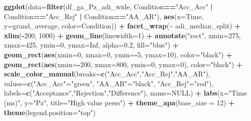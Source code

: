 \documentclass[
]{article}
\newenvironment{Shaded}{\begin{snugshade}}{\end{snugshade}}
\newcommand{\AttributeTok}[1]{\textcolor[rgb]{0.13,0.29,0.53}{#1}}
\newcommand{\ConstantTok}[1]{\textcolor[rgb]{0.56,0.35,0.01}{#1}}
\newcommand{\DecValTok}[1]{\textcolor[rgb]{0.00,0.00,0.81}{#1}}
\newcommand{\FloatTok}[1]{\textcolor[rgb]{0.00,0.00,0.81}{#1}}
\newcommand{\FunctionTok}[1]{\textcolor[rgb]{0.13,0.29,0.53}{\textbf{#1}}}
\newcommand{\NormalTok}[1]{#1}
\newcommand{\OtherTok}[1]{\textcolor[rgb]{0.56,0.35,0.01}{#1}}
\newcommand{\SpecialCharTok}[1]{\textcolor[rgb]{0.81,0.36,0.00}{\textbf{#1}}}
\newcommand{\StringTok}[1]{\textcolor[rgb]{0.31,0.60,0.02}{#1}}
\begin{document}
\begin{Shaded}
\begin{Highlighting}[]
\FunctionTok{ggplot}\NormalTok{(}\AttributeTok{data=}\FunctionTok{filter}\NormalTok{(df\_ga\_Pz\_adi\_wide, Condition}\SpecialCharTok{==}\StringTok{"Acc\_Acc"} \SpecialCharTok{|}\NormalTok{ Condition}\SpecialCharTok{==}\StringTok{"Acc\_Rej"} \SpecialCharTok{|}\NormalTok{ Condition}\SpecialCharTok{==}\StringTok{"AA\_AR"}\NormalTok{), }\FunctionTok{aes}\NormalTok{(}\AttributeTok{x=}\NormalTok{Time, }\AttributeTok{y=}\NormalTok{grand\_average, }\AttributeTok{color=}\NormalTok{Condition)) }\SpecialCharTok{+}
  \FunctionTok{facet\_wrap}\NormalTok{(}\SpecialCharTok{\textasciitilde{}}\NormalTok{ adi\_median\_split) }\SpecialCharTok{+}
  \FunctionTok{xlim}\NormalTok{(}\SpecialCharTok{{-}}\DecValTok{200}\NormalTok{, }\DecValTok{1000}\NormalTok{) }\SpecialCharTok{+}
  \FunctionTok{geom\_line}\NormalTok{(}\AttributeTok{linewidth=}\DecValTok{1}\NormalTok{) }\SpecialCharTok{+}
  \FunctionTok{annotate}\NormalTok{(}\StringTok{"rect"}\NormalTok{, }\AttributeTok{xmin=}\DecValTok{275}\NormalTok{, }\AttributeTok{xmax=}\DecValTok{425}\NormalTok{, }\AttributeTok{ymin=}\DecValTok{0}\NormalTok{, }\AttributeTok{ymax=}\ConstantTok{Inf}\NormalTok{, }\AttributeTok{alpha=}\FloatTok{0.2}\NormalTok{, }\AttributeTok{fill=}\StringTok{"blue"}\NormalTok{) }\SpecialCharTok{+}
  \FunctionTok{geom\_rect}\NormalTok{(}\FunctionTok{aes}\NormalTok{(}\AttributeTok{xmin=}\DecValTok{0}\NormalTok{, }\AttributeTok{xmax=}\DecValTok{0}\NormalTok{, }\AttributeTok{ymin=}\SpecialCharTok{{-}}\DecValTok{5}\NormalTok{, }\AttributeTok{ymax=}\DecValTok{10}\NormalTok{), }\AttributeTok{color=}\StringTok{"black"}\NormalTok{) }\SpecialCharTok{+}
  \FunctionTok{geom\_rect}\NormalTok{(}\FunctionTok{aes}\NormalTok{(}\AttributeTok{xmin=}\SpecialCharTok{{-}}\DecValTok{200}\NormalTok{, }\AttributeTok{xmax=}\DecValTok{800}\NormalTok{, }\AttributeTok{ymin=}\DecValTok{0}\NormalTok{, }\AttributeTok{ymax=}\DecValTok{0}\NormalTok{), }\AttributeTok{color=}\StringTok{"black"}\NormalTok{) }\SpecialCharTok{+}
  \FunctionTok{scale\_color\_manual}\NormalTok{(}\AttributeTok{breaks=}\FunctionTok{c}\NormalTok{(}\StringTok{"Acc\_Acc"}\NormalTok{,}\StringTok{"Acc\_Rej"}\NormalTok{,}\StringTok{"AA\_AR"}\NormalTok{),}
                     \AttributeTok{values=}\FunctionTok{c}\NormalTok{(}\StringTok{"Acc\_Acc"}\OtherTok{=}\StringTok{"green"}\NormalTok{, }\StringTok{"AA\_AR"}\OtherTok{=}\StringTok{"black"}\NormalTok{, }\StringTok{"Acc\_Rej"}\OtherTok{=}\StringTok{"red"}\NormalTok{), }
                     \AttributeTok{labels=}\FunctionTok{c}\NormalTok{(}\StringTok{"Acceptance"}\NormalTok{,}\StringTok{"Rejection"}\NormalTok{,}\StringTok{"Difference"}\NormalTok{), }\AttributeTok{name=}\ConstantTok{NULL}\NormalTok{) }\SpecialCharTok{+}
  \FunctionTok{labs}\NormalTok{(}\AttributeTok{x=}\StringTok{"Time (ms)"}\NormalTok{, }\AttributeTok{y=}\StringTok{"Pz"}\NormalTok{, }\AttributeTok{title=}\StringTok{"High value peers"}\NormalTok{) }\SpecialCharTok{+}
  \FunctionTok{theme\_apa}\NormalTok{(}\AttributeTok{base\_size =} \DecValTok{12}\NormalTok{) }\SpecialCharTok{+} \FunctionTok{theme}\NormalTok{(}\AttributeTok{legend.position=}\StringTok{"top"}\NormalTok{)}
\end{Highlighting}
\end{Shaded}
\end{document}
